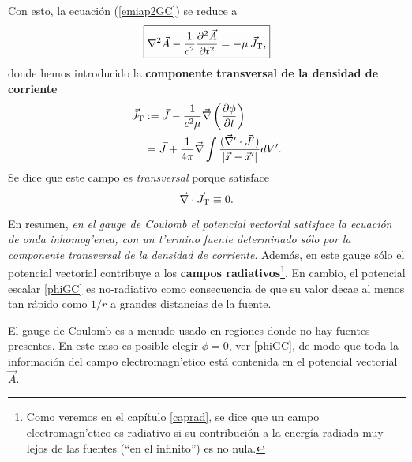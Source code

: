 Con esto, la ecuación (\ref{emiap2GC}) se reduce a
\begin{equation}\label{emiap3GC}
\boxed{\nabla^2\vec{A}-\frac{1}{c^2}\frac{\partial^2\vec{A}}{\partial t^2}=-\mu\,\vec{J}_{\rm T},}
\end{equation}
donde hemos introducido la \textbf{componente transversal de la densidad de corriente}
\begin{align}
\vec{J}_{\rm T} &:= \vec{J}-\frac{1}{c^2\mu}\vec{\nabla}\left(\frac{\partial\phi }{\partial t}\right) \\
&= \vec{J}+\frac{1}{4\pi} \vec{\nabla}\int\frac{(\vec{\nabla}'\cdot\vec{J}')}{\left|\vec{x}-\vec{x}'\right|}dV'.
\end{align}
Se dice que este campo es \textit{transversal} porque satisface
\begin{equation}
\vec\nabla\cdot\vec{J}_{\rm T}\equiv 0.
\end{equation}

En resumen, \textit{en el gauge de Coulomb el potencial vectorial satisface la  \textit{ecuación de onda inhomog'enea}, con un t'ermino fuente determinado sólo por la componente transversal de la densidad de corriente}. Además, en este gauge  sólo el potencial vectorial contribuye a los \textbf{campos radiativos}\footnote{Como veremos en el capítulo \ref{caprad}, se dice que un campo electromagn'etico es radiativo si su contribución a la energía radiada muy lejos de las fuentes (``en el infinito'') es no nula.}. En cambio, el potencial escalar \eqref{phiGC} es no-radiativo como consecuencia de que su valor decae al menos tan rápido como $1/r$ a grandes distancias de la fuente.

El gauge de Coulomb es a menudo usado en regiones donde no hay fuentes presentes. En este caso es posible elegir $\phi=0$, ver \eqref{phiGC}, de modo que toda la información del campo electromagn'etico está contenida en el potencial vectorial $\vec{A}$.


